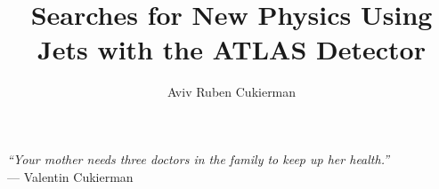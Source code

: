 \documentclass[12pt]{report}
\title{Searches for New Physics Using Jets with the ATLAS Detector}
\author{Aviv Ruben Cukierman}
\newenvironment{dedication}
  {\clearpage           %
   \thispagestyle{empty}%
   \vspace*{\stretch{1}}%
   \itshape             %
   \raggedleft          %
  }
  {\par %
   \vspace{\stretch{3}} %
   \clearpage           %
  }
\newcommand\blfootnote[1]{%
  \begingroup
  \renewcommand\thefootnote{}\footnote{#1}%
  \addtocounter{footnote}{-1}%
  \endgroup
}
\begin{document}
    \beforepreface



\clearpage
\begin{flushright}
\vspace{10mm}
{\it ``Your mother needs three doctors in the family to keep up her health.''}\\
{ --- Valentin Cukierman}\\
\end{flushright}
\clearpage

\newpage



\afterpreface



\end{document}
